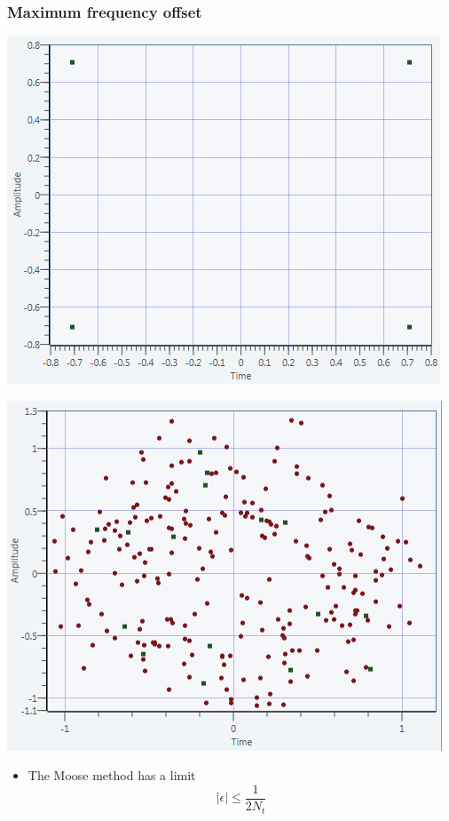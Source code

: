 \documentclass[11pt]{beamer}
\begin{document}
\begin{frame}
\frametitle{Maximum frequency offset}
\begin{minipage}[b]{0.48\linewidth}
        \centering \includegraphics[scale=0.37]{img/Moose_Limit_10k.png}
    \end{minipage}\hfill
    \begin{minipage}[b]{0.48\linewidth}
         \centering \includegraphics[scale=0.37]{img/Moose_Limit_12k.png}
    \end{minipage}
\begin{itemize}
\item The Moose method has a limit 
\begin{equation}
|\epsilon| \leq \frac{1}{2N_t}
\end{equation}
\end{itemize}
\end{frame}
\end{document}
